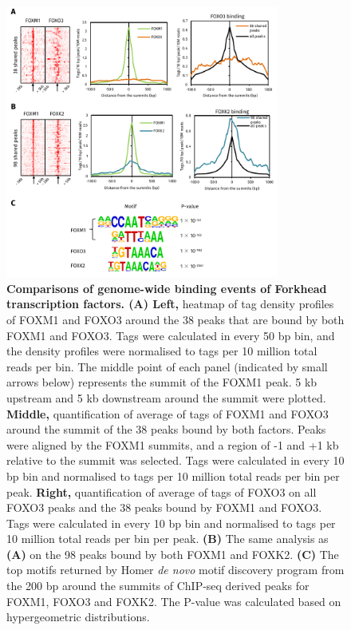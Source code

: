 \begin{figure}[!ht]
    \centering
    \includegraphics[width=0.8\textwidth]{chapter3/figures_overview/fig15.pdf}
    \caption[Comparisons of genome-wide binding events of Forkhead transcription factors]{\textbf{Comparisons of genome-wide binding events of Forkhead transcription factors. (A) Left,} heatmap of tag density profiles of FOXM1 and FOXO3 around the 38 peaks that are bound by both FOXM1 and FOXO3. Tags were calculated in every 50 bp bin, and the density profiles were normalised to tags per 10 million total reads per bin. The middle point of each panel (indicated by small arrows below) represents the summit of the FOXM1 peak. 5 kb upstream and 5 kb downstream around the summit were plotted. \textbf{Middle,} quantification of average of tags of FOXM1 and FOXO3 around the summit of the 38 peaks bound by both factors. Peaks were aligned by the FOXM1 summits, and a region of -1 and +1 kb relative to the summit was selected. Tags were calculated in every 10 bp bin and normalised to tags per 10 million total reads per bin per peak. \textbf{Right,} quantification of average of tags of FOXO3 on all FOXO3 peaks and the 38 peaks bound by FOXM1 and FOXO3. Tags were calculated in every 10 bp bin and normalised to tags per 10 million total reads per bin per peak. \textbf{(B)} The same analysis as \textbf{(A)} on the 98 peaks bound by both FOXM1 and FOXK2. \textbf{(C)} The top motifs returned by Homer \textit{de novo} motif discovery program from the 200 bp around the summits of ChIP-seq derived peaks for FOXM1, FOXO3 and FOXK2. The P-value was calculated based on hypergeometric distributions.}
    \label{fig:fig15}
\end{figure}

